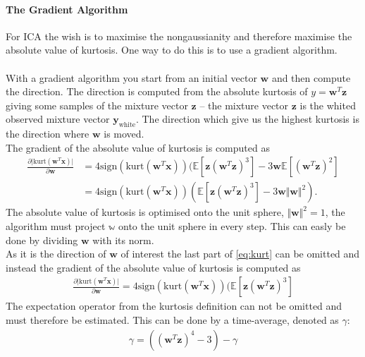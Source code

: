 \paragraph{The Gradient Algorithm}
For ICA the wish is to maximise the nongaussianity and therefore maximise the absolute value of kurtosis. One way to do this is to use a gradient algorithm.
\\ \\
With a gradient algorithm you start from an initial vector $\mathbf{w}$ and then compute the direction. The direction is computed from the absolute kurtosis of $y = \mathbf{w}^T \mathbf{z}$ giving some samples of the mixture vector $\mathbf{z}$ -- the mixture vector $\mathbf{z}$ is the whited observed mixture vector $\mathbf{y}_{\text{white}}$. The direction which give us the highest kurtosis is the direction where $\mathbf{w}$ is moved.
\\
The gradient of the absolute value of kurtosis is computed as
\begin{align}\label{eq:kurt}
\frac{\partial \vert \text{kurt}(\mathbf{w}^T \mathbf{x})\vert}{\partial \mathbf{w}} &= 4 \text{sign}(\text{kurt}(\mathbf{w}^T \mathbf{x})) (\mathbb{E}[\mathbf{z} (\mathbf{w}^T \mathbf{z})^3] - 3 \mathbf{w} \mathbb{E}[(\mathbf{w}^T\mathbf{z})^2] \nonumber \\
&= 4 \text{sign}(\text{kurt}(\mathbf{w}^T \mathbf{x})) (\mathbb{E}[\mathbf{z} (\mathbf{w}^T \mathbf{z})^3] - 3 \mathbf{w} \Vert \mathbf{w} \Vert^2).
\end{align}
The absolute value of kurtosis is optimised onto the unit sphere, $\Vert \mathbf{w} \Vert^2 = 1$, the algorithm must project $\mathbb{w}$ onto the unit sphere in every step. This can easly be done by dividing $\mathbf{w}$ with its norm. 
\\
As it is the direction of $\mathbf{w}$ of interest the last part of 
\eqref{eq:kurt} can be omitted and instead the gradient of the absolute value of kurtosis is computed as
\begin{align*}
\frac{\partial \vert \text{kurt}(\mathbf{w}^T \mathbf{x})\vert}{\partial \mathbf{w}} = 4 \text{sign}(\text{kurt}(\mathbf{w}^T \mathbf{x})) (\mathbb{E}[\mathbf{z} (\mathbf{w}^T \mathbf{z})^3]
\end{align*}
The expectation operator from the kurtosis definition can not be omitted and must therefore be estimated. This can be done by a time-average, denoted as $\gamma$:
\begin{align*}
\gamma = ((\mathbf{w}^T \mathbf{z})^4 - 3) - \gamma
\end{align*}
